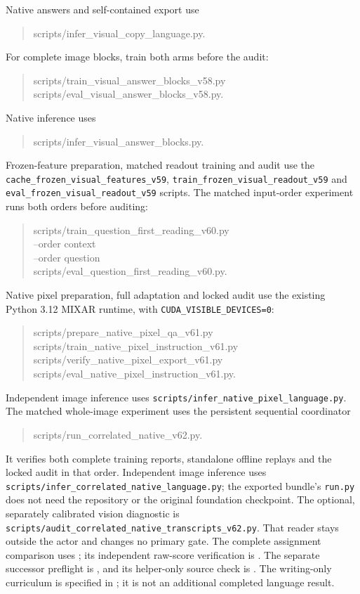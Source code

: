 \documentclass[10pt,a4paper]{article}
\providecommand{\DIFadd}[1]{{\protect\color{blue} \sf #1}} %
\providecommand{\DIFaddbegin}{} %
\begin{document}
Native answers and self-contained export use
\begin{quote}\small\ttfamily
scripts/infer\_visual\_copy\_language.py.
\end{quote}
For complete image blocks, train both arms before the audit:
\begin{quote}\small\ttfamily
scripts/train\_visual\_answer\_blocks\_v58.py\\
scripts/eval\_visual\_answer\_blocks\_v58.py.
\end{quote}
Native inference uses
\begin{quote}\small\ttfamily
scripts/infer\_visual\_answer\_blocks.py.
\end{quote}
Frozen-feature preparation, matched readout training and audit use the
\texttt{cache\_frozen\_visual\_features\_v59},
\texttt{train\_frozen\_visual\_readout\_v59} and
\texttt{eval\_frozen\_visual\_readout\_v59} scripts.
The matched input-order experiment runs both orders before auditing:
\begin{quote}\small\ttfamily
scripts/train\_question\_first\_reading\_v60.py\\
--order context\\
--order question\\
scripts/eval\_question\_first\_reading\_v60.py.
\end{quote}
Native pixel preparation, full adaptation and locked audit use the existing
Python 3.12 MIXAR runtime, with \texttt{CUDA\_VISIBLE\_DEVICES=0}:
\begin{quote}\small\ttfamily
scripts/prepare\_native\_pixel\_qa\_v61.py\\
scripts/train\_native\_pixel\_instruction\_v61.py\\
scripts/verify\_native\_pixel\_export\_v61.py\\
scripts/eval\_native\_pixel\_instruction\_v61.py.
\end{quote}
Independent image inference uses
\texttt{scripts/infer\_native\_pixel\_language.py}.
The matched whole-image experiment uses the persistent sequential coordinator
\begin{quote}\small\ttfamily
scripts/run\_correlated\_native\_v62.py.
\end{quote}
It verifies both complete training reports, standalone offline replays and
the locked audit in that order. Independent image inference uses
\texttt{scripts/infer\_correlated\_native\_language.py};
the exported bundle's \texttt{run.py} does not need the repository or the
original foundation checkpoint. The optional, separately calibrated vision
diagnostic is \texttt{scripts/audit\_correlated\_native\_transcripts\_v62.py}.
That reader stays outside the actor and changes no primary gate.
The complete assignment comparison uses
; its independent raw-score
verification is .
The separate successor preflight is ,
and its helper-only source check is .
The writing-only curriculum is specified in
; it is not an
additional \DIFaddbegin \DIFadd{completed language result.
}
\end{document}
